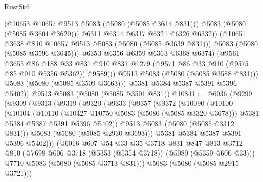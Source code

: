 \begin{lexlean}{RustStd}
\begin{coremodule}
{\begin{coremodule}
{{{{{                          (@10653 @10657 @9513 @5083 (@5080 (@5085 @3614 @831)))
                          @5083
                          (@5080 (@5085 @3604 @3620)))
                        @6311
                        @6314
                        @6317
                        @6321
                        @6326
                        @6332))
                    (@10651 @3638 @810 @10657 @9513 @5083 (@5080 (@5085 @3639 @831)))
                    @5083
                    (@5080 (@5085 @3596 @3645)))
                  @6353
                  @6356
                  @6359
                  @6363
                  @6368
                  @6374)
                (@9561
                  @3655
                  @86
                  @188
                  @33
                  @831
                  @910
                  @831
                  @1279
                  (@9571 @86 @33 @910 (@9575 @85 @910 @5356 @5362))
                  @9589)))
            @9513
            @5083
            (@5080 (@5085 @3588 @831)))
          @5083
          (@5080 (@5085 @3509 @3663)))
        @5381
        @5384
        @5387
        @5391
        @5396
        @5402))
    @9513
    @5083
    (@5080 (@5085 @3501 @831))
@10841 := @6036
    (@9299
      (@9309
        (@9313
          (@9319
            (@9329
              (@9333
                (@9357
                  (@9372
                    (@10090
                      (@10100
                        (@10104
                          (@10110
                            (@10427 @10750 @5083 (@5080 (@5085 @3320 @3678)))
                            @5381
                            @5384
                            @5387
                            @5391
                            @5396
                            @5402))
                        @9513
                        @5083
                        (@5080 (@5085 @3312 @831)))
                      @5083
                      (@5080 (@5085 @2930 @3693)))
                    @5381
                    @5384
                    @5387
                    @5391
                    @5396
                    @5402)))
              (@6016
                @607
                @54
                @33
                @35
                @3718
                @831
                @847
                @813
                @3712
                @810
                (@7698 @606 @3718 (@5353 (@5354 @3718)) (@5080 (@5359 @606 @33)))
                @7710
                @5083
                (@5080 (@5085 @3713 @831)))
              @5083
              (@5080 (@5085 @2915 @3721)))
}}}}}
\end{coremodule}}
\end{coremodule}
\end{lexlean}
